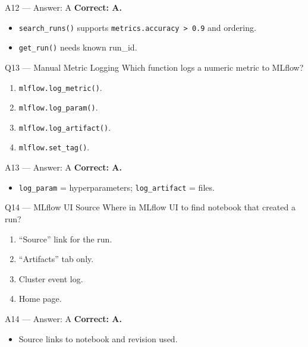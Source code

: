 \documentclass[aspectratio=169,9pt]{beamer}
\begin{document}
	\begin{frame}{A12 — Answer: A}
		\textbf{Correct: A.}
		\begin{itemize}
			\item \texttt{search\_runs()} supports \texttt{metrics.accuracy > 0.9} and ordering.
			\item \texttt{get\_run()} needs known run\_id.
		\end{itemize}
	\end{frame}
	
	\begin{frame}{Q13 — Manual Metric Logging}
		Which function logs a numeric metric to MLflow?
		\begin{enumerate}[label=\Alph*.]
			\item \texttt{mlflow.log\_metric()}.
			\item \texttt{mlflow.log\_param()}.
			\item \texttt{mlflow.log\_artifact()}.
			\item \texttt{mlflow.set\_tag()}.
		\end{enumerate}
	\end{frame}
	
	\begin{frame}{A13 — Answer: A}
		\textbf{Correct: A.}
		\begin{itemize}
			\item \texttt{log\_param} = hyperparameters; \texttt{log\_artifact} = files.
		\end{itemize}
	\end{frame}
	
	\begin{frame}{Q14 — MLflow UI Source}
		Where in MLflow UI to find notebook that created a run?
		\begin{enumerate}[label=\Alph*.]
			\item ``Source'' link for the run.
			\item ``Artifacts'' tab only.
			\item Cluster event log.
			\item Home page.
		\end{enumerate}
	\end{frame}
	
	\begin{frame}{A14 — Answer: A}
		\textbf{Correct: A.}
		\begin{itemize}
			\item Source links to notebook and revision used.
		\end{itemize}
	\end{frame}
	
\end{document}
